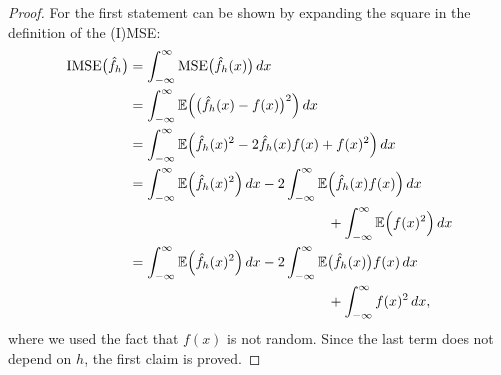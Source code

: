 \documentclass[
  a4paper,
]{article}
\theoremstyle{definition}
\theoremstyle{definition}
\theoremstyle{definition}
\theoremstyle{definition}
\theoremstyle{remark}
\begin{document}
\begin{proof}
For the first statement can be shown by expanding the square in the
definition of the (I)MSE:
\begin{align*}
  \mathrm{IMSE}\bigl( \hat f_h \bigr)
  &= \int_{-\infty}^\infty \mathop{\mathrm{MSE}}\nolimits\bigl( \hat f_h(x) \bigr) \,dx \\
  &= \int_{-\infty}^\infty \mathbb{E}\Bigl( \bigl( \hat f_h(x) - f(x) \bigr)^2 \Bigr) \,dx \\
  &= \int_{-\infty}^\infty \mathbb{E}\Bigl( \hat f_h(x)^2 - 2 \hat f_h(x) f(x)  + f(x)^2 \Bigr) \,dx \\
  &= \int_{-\infty}^\infty \mathbb{E}\Bigl( \hat f_h(x)^2 \Bigr) \,dx
         - 2 \int_{-\infty}^\infty \mathbb{E}\Bigl( \hat f_h(x) f(x) \Bigr) \,dx \\
      &\hskip5cm
         + \int_{-\infty}^\infty \mathbb{E}\Bigl( f(x)^2 \Bigr) \,dx \\
  &= \int_{-\infty}^\infty \mathbb{E}\Bigl( \hat f_h(x)^2 \Bigr) \,dx
         - 2 \int_{-\infty}^\infty \mathbb{E}\bigl( \hat f_h(x) \bigr) f(x) \,dx \\
      &\hskip5cm
         + \int_{-\infty}^\infty f(x)^2 \,dx,
\end{align*}
where we used the fact that \(f(x)\) is not random.
Since the last term does not depend on \(h\), the first claim is proved.


\end{proof}
\end{document}
